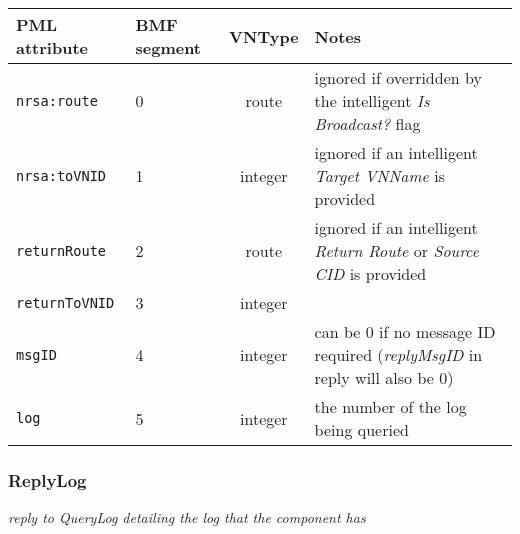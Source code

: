 \documentclass[pdftex,a4paper]{article}
\newcommand{\XMLfont}[1]{{\tt \small #1}}
\begin{document}
\begin{table}[!h]
  \begin{center}
    \label{tab:QueryLog}
    \begin{tabular}{|l|p{13mm}|c|p{60mm}|}
      \hline

      \textbf{PML attribute} & \textbf{BMF segment} & \textbf{VNType}
      & \textbf{Notes} \\\hline

      \XMLfont{nrsa:route} & 0 & route & ignored if overridden by the
      intelligent {\em Is Broadcast?} flag \\\hline

      \XMLfont{nrsa:toVNID} & 1 & integer & ignored if an intelligent {\em
      Target VNName} is provided \\\hline

      \XMLfont{returnRoute} & 2 & route & ignored if an
      intelligent {\em Return Route} or {\em Source CID} is provided
      \\\hline

      \XMLfont{returnToVNID} & 3 & integer & \\\hline

      \XMLfont{msgID} & 4 & integer & can be 0 if no message ID
      required ({\em replyMsgID} in reply will also be 0) \\\hline

      \XMLfont{log} & 5 & integer & the number of the log being
      queried \\\hline

    \end{tabular}
  \end{center}
\end{table}

\subsubsection{ReplyLog}

{\em reply to QueryLog detailing the log that the component has}
\end{document}
